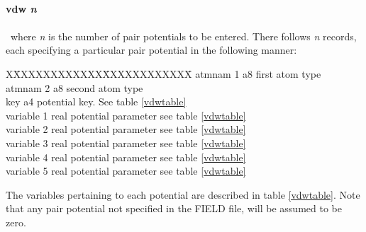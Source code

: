 \paragraph*{vdw {\em n}}
\paragraph*{}

\noindent
~where {\em n} is the number of pair potentials to be entered. There
follows {\em n} records, each specifying a particular pair potential
in the following manner:

\begin{tabbing}
X\=XXXXXXXXXXXX\=XXXXXXXXXXXX\=\kill
\> atmnam 1 \> a8 \> first atom type\\
\> atmnam 2 \> a8 \> second atom type\\
\> key \> a4 \> potential key. See table \ref{vdwtable}\\
\> variable 1 \> real \> potential parameter see table
\ref{vdwtable}\\
\> variable 2 \> real \> potential parameter see table
\ref{vdwtable}\\
\> variable 3 \> real \> potential parameter see table
\ref{vdwtable}\\
\> variable 4 \> real \> potential parameter see table
\ref{vdwtable}\\
\> variable 5 \> real \> potential parameter see table
\ref{vdwtable}\\
\end{tabbing}

\noindent The variables pertaining to each potential are described in table
\ref{vdwtable}.
Note that any pair potential not specified in the FIELD file, will be
assumed to be zero. 

